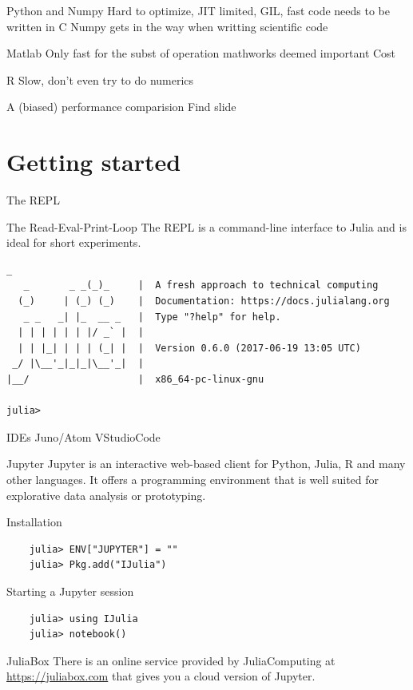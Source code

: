\documentclass{beamer}
\begin{document}
\begin{frame}{Python and Numpy}
  Hard to optimize, JIT limited, GIL, fast code needs to be written in C
  Numpy gets in the way when writting scientific code
\end{frame}

\begin{frame}{Matlab}
  Only fast for the subst of operation mathworks deemed important
  Cost
\end{frame}

\begin{frame}{R}
  Slow, don't even try to do numerics
\end{frame}

\begin{frame}{A (biased) performance comparision}
  Find slide
\end{frame}

\section{Getting started}
\begin{frame}[fragile]{The REPL}
  \begin{block}{The Read-Eval-Print-Loop}
    The REPL is a command-line interface to Julia and is ideal for short experiments.
    \begin{Verbatim}[fontsize=\footnotesize]
               _
   _       _ _(_)_     |  A fresh approach to technical computing
  (_)     | (_) (_)    |  Documentation: https://docs.julialang.org
   _ _   _| |_  __ _   |  Type "?help" for help.
  | | | | | | |/ _` |  |
  | | |_| | | | (_| |  |  Version 0.6.0 (2017-06-19 13:05 UTC)
 _/ |\__'_|_|_|\__'_|  |  
|__/                   |  x86_64-pc-linux-gnu

julia> 

\end{Verbatim}
  \end{block}
\end{frame}
\begin{frame}{IDEs}
  Juno/Atom
  VStudioCode
\end{frame}
\begin{frame}[fragile]{Jupyter}
  Jupyter is an interactive web-based client for Python, Julia, R and many other languages.
  It offers a programming environment that is well suited for explorative data analysis or prototyping.
  \begin{block}{Installation}
  \begin{Verbatim}
    julia> ENV["JUPYTER"] = ""
    julia> Pkg.add("IJulia")
    \end{Verbatim}
  \end{block}
  \begin{block}{Starting a Jupyter session}
    \begin{Verbatim}
    julia> using IJulia
    julia> notebook()
    \end{Verbatim}
  \end{block}
  \begin{block}{JuliaBox}
    There is an online service provided by JuliaComputing at \url{https://juliabox.com} that gives you a cloud version of Jupyter.
  \end{block}
\end{frame}
\end{document}
